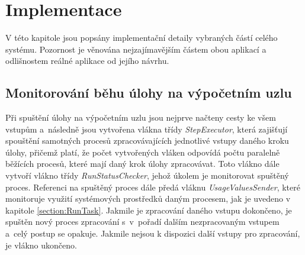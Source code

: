 

\chapter{Implementace}
\label{chapter:implementation}

V této kapitole jsou popsány implementační detaily vybraných částí celého systému. Pozornost je věnována nejzajímavějším částem obou aplikací a odlišnostem reálné aplikace od jejího návrhu.

\section{Monitorování běhu úlohy na výpočetním uzlu}

Při spuštění úlohy na výpočetním uzlu jsou nejprve načteny cesty ke všem vstupům a~následně jsou vytvořena vlákna třídy \textit{StepExecutor}, která zajišťují spouštění samotných procesů zpracovávajících jednotlivé vstupy daného kroku úlohy, přičemž platí, že počet vytvořených vláken odpovídá počtu paralelně běžících procesů, které mají daný krok úlohy zpracovávat. Toto vlákno dále vytvoří vlákno třídy \textit{RunStatusChecker}, jehož úkolem je monitorovat spuštěný proces. Referenci na spuštěný proces dále předá vláknu \textit{UsageValuesSender}, které monitoruje využití systémových prostředků daným procesem, jak je uvedeno v kapitole \ref{section:RunTask}. Jakmile je zpracování daného vstupu dokončeno, je spuštěn nový proces zpracování s~v~pořadí dalším nezpracovaným vstupem a~celý postup se opakuje. Jakmile nejsou k dispozici další vstupy pro zpracování, je vlákno ukončeno.

